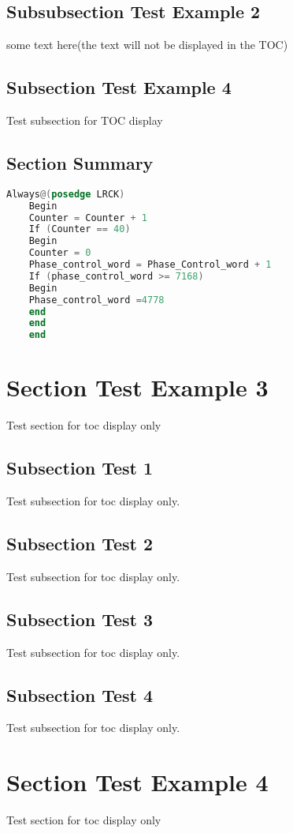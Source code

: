{\subsection*{Subsubsection Test Example 2}

some text here(the text will not be displayed in the TOC)


\subsection{Subsection Test Example 4}
Test subsection for TOC display

\subsection{Section Summary}
  
\begin{lstlisting}[language={Verilog},tabsize=5,title={A simple paragraph of Verilog code is below in verbatim}]
  Always@(posedge LRCK)
	Begin
	Counter = Counter + 1
	If (Counter == 40)
	Begin
	Counter = 0
	Phase_control_word = Phase_Control_word + 1
	If (phase_control_word >= 7168)
	Begin
	Phase_control_word =4778
	end
	end
	end
\end{lstlisting}

\section{Section Test Example 3}
Test section for toc display only

\subsection{Subsection Test 1}
Test subsection for toc display only.

\subsection{Subsection Test 2}
Test subsection for toc display only.

\subsection{Subsection Test 3}
Test subsection for toc display only.

\subsection{Subsection Test 4}
Test subsection for toc display only.

\section{Section Test Example 4}
Test section for toc display only}






